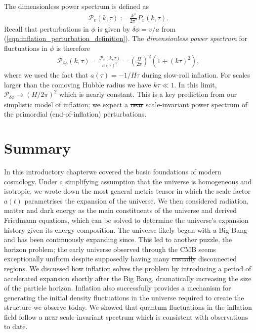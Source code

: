 \documentclass[a4paper,12pt,times,custombib,print,index]{Classes/PhDThesisPSnPDF} %
\providecommand{\DIFadd}[1]{{\protect\color{blue}\uwave{#1}}} %
\providecommand{\DIFdel}[1]{{\protect\color{red}\sout{#1}}}                      %
\providecommand{\DIFaddbegin}{} %
\providecommand{\DIFaddend}{} %
\providecommand{\DIFdelbegin}{} %
\providecommand{\DIFdelend}{} %
\newcommand{\DIFscaledelfig}{0.5}
\newlength{\DIFdelgraphicswidth} %
\newlength{\DIFdelgraphicsheight} %
\newcommand{\DIFaddincludegraphics}[2][]{{\color{blue}\fbox{\DIFOincludegraphics[#1]{#2}}}} %
\newcommand{\DIFdelincludegraphics}[2][]{%
\sbox{\DIFdelgraphicsbox}{\DIFOincludegraphics[#1]{#2}}%
\settoboxwidth{\DIFdelgraphicswidth}{\DIFdelgraphicsbox} %
\settoboxtotalheight{\DIFdelgraphicsheight}{\DIFdelgraphicsbox} %
\scalebox{\DIFscaledelfig}{%
\parbox[b]{\DIFdelgraphicswidth}{\usebox{\DIFdelgraphicsbox}\\[-\baselineskip] \rule{\DIFdelgraphicswidth}{0em}}\llap{\resizebox{\DIFdelgraphicswidth}{\DIFdelgraphicsheight}{%
\setlength{\unitlength}{\DIFdelgraphicswidth}%
\begin{picture}(1,1)%
\thicklines\linethickness{2pt} %
{\color[rgb]{1,0,0}\put(0,0){\framebox(1,1){}}}%
{\color[rgb]{1,0,0}\put(0,0){\line( 1,1){1}}}%
{\color[rgb]{1,0,0}\put(0,1){\line(1,-1){1}}}%
\end{picture}%
}\hspace*{3pt}}} %
} %
\DeclareRobustCommand{\DIFaddbegin}{\DIFOaddbegin \let\includegraphics\DIFaddincludegraphics} %
\DeclareRobustCommand{\DIFaddend}{\DIFOaddend \let\includegraphics\DIFOincludegraphics} %
\DeclareRobustCommand{\DIFdelbegin}{\DIFOdelbegin \let\includegraphics\DIFdelincludegraphics} %
\DeclareRobustCommand{\DIFdelend}{\DIFOaddend \let\includegraphics\DIFOincludegraphics} %
\begin{document}
The dimensionless power spectrum is defined as
\begin{align}
	\mathcal{P}_v (k,\tau) := \frac{k^3}{2\pi^2} P_v(k,\tau).
\end{align}
Recall that perturbations in $\phi$ is given by $\delta\phi = v/a$ from (\ref{eqn:inflation_perturbation_definition}). The \textit{dimensionless power spectrum} for fluctuations in $\phi$ is therefore
\begin{align}
	\mathcal{P}_{\delta\phi} (k,\tau) = \frac{\mathcal{P}_v (k,\tau)}{a(\tau)^2} = \left( \frac{H}{2\pi} \right)^2 \left(1 + (k\tau)^2 \right),
\end{align}
where we used the fact that $a(\tau) = -1/H\tau$ during slow-roll inflation. For scales larger than the comoving Hubble radius we have $k\tau \ll 1$. In this limit, $\mathcal{P}_{\delta\phi} \rightarrow (H/2\pi)^2$ which is nearly constant. This is a key prediction from our simplistic model of inflation; we expect a \DIFdelbegin \DIFdel{near }\DIFdelend \DIFaddbegin \DIFadd{nearly }\DIFaddend scale-invariant power spectrum of the primordial (end-of-inflation) perturbations.


\newpage
\section*{Summary}

In this introductory chapter\DIFaddbegin \DIFadd{, }\DIFaddend we covered the basic foundations of modern cosmology. Under a simplifying assumption that the universe is homogeneous and isotropic, we wrote down the most general metric tensor in which the scale factor $a(t)$ parametrises the expansion of the universe. We then considered radiation, matter and dark energy as the main constituents of the universe and derived Friedmann equations, which can be solved to determine the universe's expansion history given its energy composition. The universe likely began with a Big Bang and has been continuously expanding since. This led to another puzzle, the horizon problem; the early universe observed through the CMB seems exceptionally uniform despite supposedly having many \DIFdelbegin \DIFdel{casually }\DIFdelend \DIFaddbegin \DIFadd{causally }\DIFaddend disconnected regions. We discussed how inflation solves the problem by introducing a period of accelerated expansion shortly after the Big Bang, dramatically increasing the size of the particle horizon. Inflation also successfully provides a mechanism for generating the initial density fluctuations in the universe required to create the structure we observe today. We showed that quantum fluctuations in the inflation field follow a \DIFdelbegin \DIFdel{near }\DIFdelend \DIFaddbegin \DIFadd{nearly }\DIFaddend scale-invariant spectrum which is consistent with observations to date.
\end{document}
